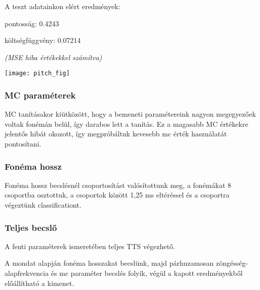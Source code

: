 A teszt adatainkon elért eredmények:

pontosság: 0.4243

költségfüggvény: 0.07214

\textit{(MSE hiba értékekkel számítva)}

\texttt{[image: pitch\_fig]}
\subsubsection{MC paraméterek}
MC tanításakor kiütközött, hogy a bemeneti paramétereink nagyon megegyezőek voltak fonémán belül, így darabos lett a tanítás. Ez a magasabb MC értékekre jelentős hibát okozott, így megpróbáltuk kevesebb mc érték használatát pontosítani.
\subsubsection{Fonéma hossz}
Fonéma hossz becslésnél csoportosítást valósítottunk meg, a fonémákat 8 csoportba osztottuk, a csoportok között 1,25 ms eltéréssel és a csoportra végeztünk classificationt.
\subsubsection{Teljes becslő}
A fenti paraméterek ismeretében teljes TTS végezhető. 

A mondat alapján fonéma hosszakat becslünk, majd párhuzamosan zöngésség-alapfrekvencia és mc paraméter becslés folyik, végül a kapott eredményekből előállítható a kimenet.